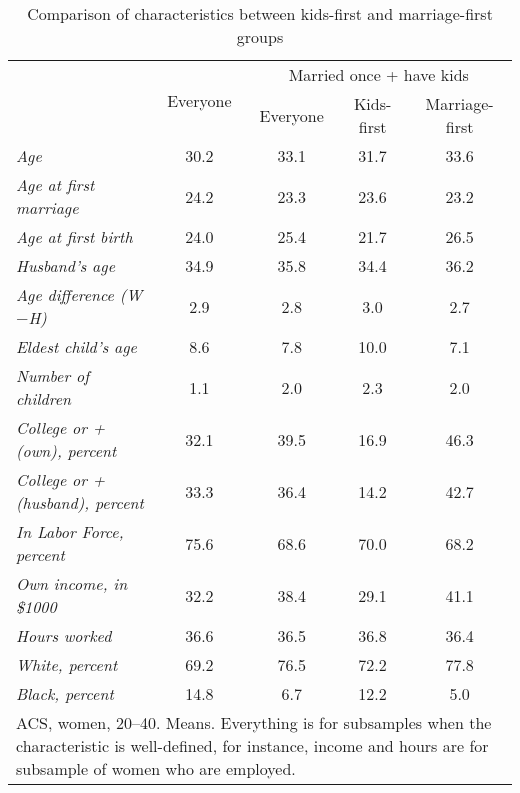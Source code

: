 \documentclass[12pt,letter]{article}
\begin{document}
\begin{table}[h!]
\begin{center}\small
\begin{tabular}{ l c c c c }\cline{2-5}
\multicolumn{1}{c}{} & \multirow{2}{*}{Everyone} & \multicolumn{3}{c}{Married once + have kids}\\\cline{3-5}
\multicolumn{1}{c}{}  & & Everyone & Kids-first & Marriage-first \\\cline{2-5}\hline
\textit{Age} & 30.2    &  33.1     &       31.7     &       33.6 \\
\textit{Age at first marriage} & 24.2         &   23.3        &    23.6        &    23.2 \\
\textit{Age at first birth}  & 24.0       &     25.4     &       21.7       &     26.5 \\
\textit{Husband's age} & 34.9        &    35.8      &      34.4   &         36.2  \\
\textit{Age difference (W$-$H)} &  2.9       &      2.8      &       3.0      &       2.7  \\\hline
\textit{Eldest child's age} & 8.6         &    7.8    &        10.0     &        7.1 \\
\textit{Number of children} & 1.1       &      2.0      &       2.3     &       2.0 \\\hline
\textit{College or + (own), percent} & 32.1   &         39.5     &       16.9     &       46.3 \\
\textit{College or + (husband), percent} & 33.3     &       36.4     &       14.2       &     42.7 \\\hline
\textit{In Labor Force, percent} & 75.6    &        68.6    &        70.0        &    68.2 \\
\textit{Own income, in \$1000} & 32.2 &         38.4 &          29.1 &         41.1 \\
\textit{Hours worked} & 36.6       &     36.5    &        36.8        &    36.4\\\hline
\textit{White, percent} & 69.2      &      76.5      &      72.2     &      77.8 \\
\textit{Black, percent} & 14.8 &        6.7 &            12.2       &       5.0 \\\hline\hline
\multicolumn{5}{p{0.8\linewidth}}{\footnotesize ACS, women, 20--40. Means. Everything is for subsamples when the characteristic is well-defined, for instance, income and hours are for subsample of women who are employed.}\\\hline
\end{tabular}
\caption{Comparison of characteristics between kids-first and marriage-first groups\label{diff-comp}}
\end{center}
\end{table}
\end{document}
